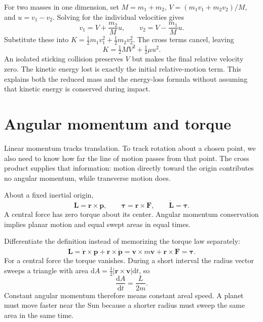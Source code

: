 \documentclass[11pt,oneside]{book}
\newcommand{\dd}{\mathrm{d}}
\newcommand{\vect}[1]{\boldsymbol{#1}}
\newcommand{\od}[2]{\frac{\dd #1}{\dd #2}}
\theoremstyle{reviewstyle}
\begin{document}
For two masses in one dimension, set $M=m_1+m_2$, $V=(m_1v_1+m_2v_2)/M$, and $u=v_1-v_2$. Solving for the individual velocities gives
\begin{equation}
v_1=V+\frac{m_2}{M}u,\qquad v_2=V-\frac{m_1}{M}u.
\end{equation}
Substitute these into $K=\tfrac12m_1v_1^2+\tfrac12m_2v_2^2$. The cross terms cancel, leaving
\begin{equation}
K=\tfrac12MV^2+\tfrac12\mu u^2.
\end{equation}
An isolated sticking collision preserves $V$ but makes the final relative velocity zero. The kinetic energy lost is exactly the initial relative-motion term. This explains both the reduced mass and the energy-loss formula without assuming that kinetic energy is conserved during impact.

\section{Angular momentum and torque}
Linear momentum tracks translation. To track rotation about a chosen point, we also need to know how far the line of motion passes from that point. The cross product supplies that information: motion directly toward the origin contributes no angular momentum, while transverse motion does.

About a fixed inertial origin,
\begin{equation}
\vect L=\vect r\times\vect p,\qquad
\vect\tau=\vect r\times\vect F,\qquad
\dot{\vect L}=\vect\tau.
\end{equation}
A central force has zero torque about its center. Angular momentum conservation implies planar motion and equal swept areas in equal times.

Differentiate the definition instead of memorizing the torque law separately:
\begin{equation}
\dot{\vect L}=\dot{\vect r}\times\vect p+\vect r\times\dot{\vect p}
=\vect v\times m\vect v+\vect r\times\vect F
=\vect\tau.
\end{equation}
For a central force the torque vanishes. During a short interval the radius vector sweeps a triangle with area $\dd A=\tfrac12|\vect r\times\vect v|\dd t$, so
\begin{equation}
\od{A}{t}=\frac{L}{2m}.
\end{equation}
Constant angular momentum therefore means constant areal speed. A planet must move faster near the Sun because a shorter radius must sweep the same area in the same time.
\end{document}

